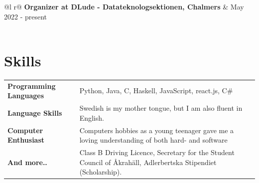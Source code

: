 \documentclass[a4paper,12pt]{article}
\begin{document}
\begin{tabularx}{\linewidth}{ @{}l r@{} }
\textbf{Organizer at \textbf{DLude - Datateknologsektionen, Chalmers}} & \hfill May 2022 - present \\[3.75pt]
  \\
\end{tabularx}



\section{Skills}
\begin{tabularx}{\linewidth}{@{}l X@{}}
\textbf{Programming Languages} &  \normalsize{Python, Java, C, Haskell, JavaScript, react.js, C\#}\\
\textbf{Language Skills}  &  \normalsize{Swedish is my mother tongue, but I am also fluent in English.}\\
\textbf{Computer Enthusiast}  &  \normalsize{Computers hobbies as a young teenager gave me a loving understanding of both hard- and software} \\
\textbf{And more..}  &  \normalsize{Class B Driving Licence, Secretary for the Student Council of Åkrahäll, Adlerbertska Stipendiet (Scholarship).}
\end{tabularx}

\vfill
\end{document}
